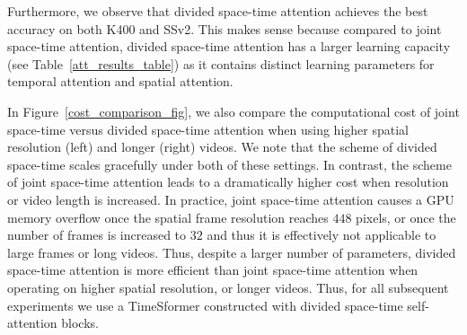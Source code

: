 \documentclass{article}
\begin{document}


Furthermore, we observe that divided space-time attention achieves the best accuracy on both K400 and SSv2. This makes sense because compared to joint space-time attention, divided space-time attention has a larger learning capacity (see Table~\ref{att_results_table}) as it contains distinct learning parameters for temporal attention and spatial attention. 

In Figure~\ref{cost_comparison_fig}, we also compare the computational cost of joint space-time versus divided space-time attention when using higher spatial resolution (left) and longer (right) videos. We note that the scheme of divided space-time scales gracefully under both of these settings. In contrast, the scheme of joint space-time attention leads to a dramatically higher cost when resolution or video length is increased. In practice, joint space-time attention causes a GPU memory overflow once the spatial frame resolution reaches $448$ pixels, or once the number of frames is increased to $32$ and thus it is effectively not applicable to large frames or long videos. Thus, despite a larger number of parameters, divided space-time attention is more efficient than joint space-time attention when operating on higher spatial resolution, or longer videos. Thus, for all subsequent experiments we use a TimeSformer constructed with divided space-time self-attention blocks.



\end{document}
